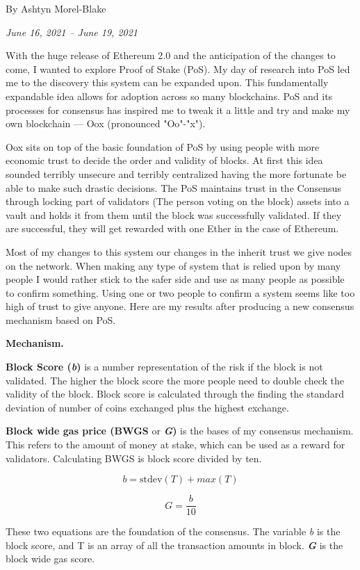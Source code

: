 \documentclass[
]{article}
\author{}
\date{}
\begin{document}
By Ashtyn Morel-Blake

\emph{June 16, 2021 -- June 19, 2021}

With the huge release of Ethereum 2.0 and the anticipation of the
changes to come, I wanted to explore Proof of Stake (PoS). My day of
research into PoS led me to the discovery this system can be expanded
upon. This fundamentally expandable idea allows for adoption across so
many blockchains. PoS and its processes for consensus has inspired me to
tweak it a little and try and make my own blockchain --- Oox (pronounced
"Oo"-"x").

Oox sits on top of the basic foundation of PoS by using people with more
economic trust to decide the order and validity of blocks. At first this
idea sounded terribly unsecure and terribly centralized having the more
fortunate be able to make such drastic decisions. The PoS maintains
trust in the Consensus through locking part of validators (The person
voting on the block) assets into a vault and holds it from them until
the block was successfully validated. If they are successful, they will
get rewarded with one Ether in the case of Ethereum.

Most of my changes to this system our changes in the inherit trust we
give nodes on the network. When making any type of system that is relied
upon by many people I would rather stick to the safer side and use as
many people as possible to confirm something. Using one or two people to
confirm a system seems like too high of trust to give anyone. Here are
my results after producing a new consensus mechanism based on PoS.

\textbf{Mechanism.}

\textbf{Block Score (\emph{b})} is a number representation of the risk
if the block is not validated. The higher the block score the more
people need to double check the validity of the block. Block score is
calculated through the finding the standard deviation of number of coins
exchanged plus the highest exchange.

\textbf{Block wide gas price (BWGS} or \textbf{\emph{G})} is the bases
of my consensus mechanism. This refers to the amount of money at stake,
which can be used as a reward for validators. Calculating BWGS is block
score divided by ten.

\[b = \text{stdev}(T) + max(T)\]

\[G = \frac{b}{10}\]

These two equations are the foundation of the consensus. The variable
\emph{b} is the block score, and T is an array of all the transaction
amounts in block. \textbf{\emph{G}} is the block wide gas score.
\end{document}
